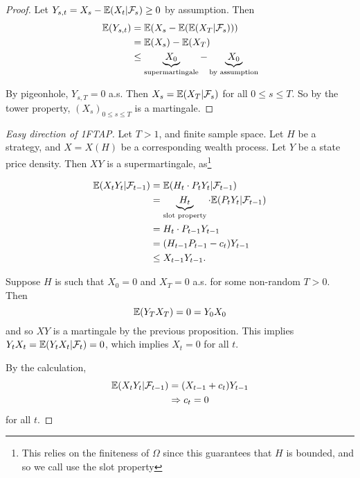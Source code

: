 \begin{proof}
  Let $Y_{s, t} = X_{s} - \E{X_{t} | \mathcal{F}_{s}} \geq 0$ by
  assumption. Then
  \begin{align*}
    \E{Y_{s, t}} & = \E{X_{s} - \E{\E{X_{T} | \mathcal{F}_{s}}}} \\
                 & = \E{X_{s}} - \E{X_{T}}                       \\
                 & \leq \underbrace{X_{0}}_{\text{supermartingale}} -
    \underbrace{X_{0}}_{\text{by assumption}}
  \end{align*}

  By pigeonhole, $Y_{s, T} = 0$ a.s.  Then $X_{s} = \E{X_{T} |
    \mathcal{F}_{s}}$ for all $0 \leq s \leq T$.  So by the tower
  property, $(X_{s})_{0 \leq s \leq T}$ is a martingale.
\end{proof}

\begin{proof}[Easy direction of 1FTAP]
  Let $T > 1$, and finite sample space. Let $H$ be a strategy, and $X
  = X(H)$ be a corresponding wealth process. Let $Y$ be a state price
  density. Then $XY$ is a supermartingale, as\footnote{This relies on
    the finiteness of $\Omega$ since this guarantees that $H$ is
    bounded, and so we call use the slot property}

  \begin{align*}
    \E{X_{t} Y_{t} | \mathcal{F}_{t-1}} & = \E{H_{t} \cdot P_{t} Y_{t}
      | \mathcal{F}_{t-1}}                                                                                                      \\
                                        & = \underbrace{H_{t}}_{\text{slot property}} \cdot \E{P_{t} Y_{t} | \mathcal{F}_{t-1}} \\
                                        & = H_{t} \cdot P_{t-1} Y_{t-1}                                                         \\
                                        & = (H_{t-1} P_{t-1} - c_{t}) Y_{t-1}                                                   \\
                                        & \leq X_{t-1} Y_{t-1}.
  \end{align*}

  Suppose $H$ is such that $X_{0} = 0$ and $X_{T}= 0$ a.s. for some
  non-random $T > 0$. Then
  \begin{equation}
    \label{eq:10}
    \E{Y_{T} X_{T}} = 0 = Y_{0} X_{0}
  \end{equation} and so $XY$ is a martingale by the previous
  proposition.  This implies $Y_{t} X_{t} = \E{Y_{t} X_{t} |
    \mathcal{F}_{t}} = 0$, which implies $X_{t} = 0$ for all $t$.

  By the calculation,
  \begin{align*}
    \E{X_{t} Y_{t} | \mathcal{F}_{t-1}} & = (X_{t-1} + c_{t}) Y_{t-1}
 \\
                                        & \Rightarrow c_{t} = 0
  \end{align*} for all $t$.
\end{proof}

